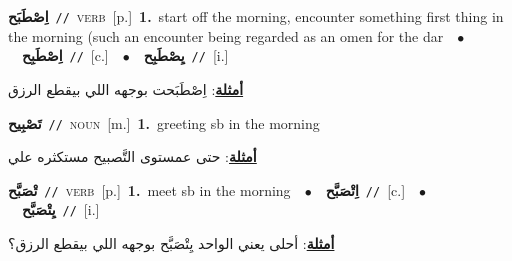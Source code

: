 \documentclass[10pt,a4paper,twoside]{article} %
\begin{document}
\begin{multicols}{2}
{\setlength\topsep{0pt}\textbf{\foreignlanguage{arabic}{اِصْطَبَح}}\ {\color{gray}\texttt{//}\color{black}}\ \textsc{verb}\ [p.]\ \textbf{1.}~start off the morning, encounter something first thing in the morning (such an encounter being regarded as an omen for the dar\ \ $\bullet$\ \ \setlength\topsep{0pt}\textbf{\foreignlanguage{arabic}{اِصْطَبِح}}\ {\color{gray}\texttt{//}\color{black}}\ [c.]\ \ $\bullet$\ \ \setlength\topsep{0pt}\textbf{\foreignlanguage{arabic}{يِصْطَبِح}}\ {\color{gray}\texttt{//}\color{black}}\ [i.]\  \begin{flushright}\color{gray}\foreignlanguage{arabic}{\textbf{\underline{\foreignlanguage{arabic}{أمثلة}}}: اِصْطَبَحت بوجهه اللي بيقطع الرزق}\end{flushright}\color{black}} \vspace{2mm}

{\setlength\topsep{0pt}\textbf{\foreignlanguage{arabic}{تَصْبِيح}}\ {\color{gray}\texttt{//}\color{black}}\ \textsc{noun}\ [m.]\ \textbf{1.}~greeting sb in the morning\  \begin{flushright}\color{gray}\foreignlanguage{arabic}{\textbf{\underline{\foreignlanguage{arabic}{أمثلة}}}: حتى عمستوى التَّصبيح مستكثره علي}\end{flushright}\color{black}} \vspace{2mm}

{\setlength\topsep{0pt}\textbf{\foreignlanguage{arabic}{تْصَبَّح}}\ {\color{gray}\texttt{//}\color{black}}\ \textsc{verb}\ [p.]\ \textbf{1.}~meet sb in the morning\ \ $\bullet$\ \ \setlength\topsep{0pt}\textbf{\foreignlanguage{arabic}{اِتْصَبَّح}}\ {\color{gray}\texttt{//}\color{black}}\ [c.]\ \ $\bullet$\ \ \setlength\topsep{0pt}\textbf{\foreignlanguage{arabic}{يِتْصَبَّح}}\ {\color{gray}\texttt{//}\color{black}}\ [i.]\  \begin{flushright}\color{gray}\foreignlanguage{arabic}{\textbf{\underline{\foreignlanguage{arabic}{أمثلة}}}: أحلى يعني الواحد يِتْصَبَّح بوجهه اللي بيقطع الرزق؟}\end{flushright}\color{black}} \vspace{2mm}


\end{multicols}
\end{document}
